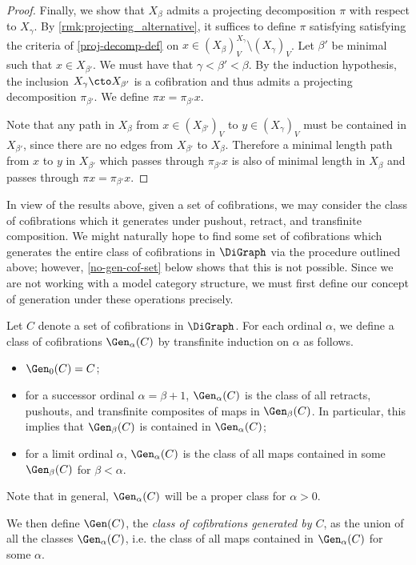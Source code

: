 \begin{proof}
Finally, we show that $X_\beta$ admits a projecting decomposition $\pi$ with respect to $X_\gamma$. By \cref{rmk:projecting_alternative}, it suffices to define $\pi$ satisfying satisfying the criteria of \cref{proj-decomp-def} on $x \in (X_\beta)^{X_{\gamma}}_V \setminus (X_{\gamma})_V$. Let $\beta'$ be minimal such that $x\in X_{\beta'}$. We must have that $\gamma < \beta' < \beta$. By the induction hypothesis, the inclusion $X_\gamma \cto X_{\beta'}$ is a cofibration and thus admits a projecting decomposition $\pi_{\beta'}$. We define $\pi x = \pi_{\beta'} x$.

Note that any path in $X_\beta$ from $x \in (X_{\beta'})_V$ to $y\in (X_\gamma)_V$ must be contained in $X_{\beta'}$, since there are no edges from $X_{\beta'}$ to $ X_{\beta}$. Therefore a minimal length path from $x$ to $y$ in $X_{\beta'}$ which passes through $\pi_{\beta'}x$ is also of minimal length in $X_\beta$ and passes through $\pi x=\pi_{\beta'}x$.
\end{proof}

In view of the results above, given a set of cofibrations, we may consider the class of cofibrations which it generates under pushout, retract, and transfinite composition. 
We might naturally hope to find some set of cofibrations which generates the entire class of cofibrations in $\DiGraph$ via the procedure outlined above; however, \cref{no-gen-cof-set} below shows that this is not possible.
Since we are not working with a model category structure, we must first define our concept of generation under these operations precisely.

\begin{defi}
Let $C$ denote a set of cofibrations in $\DiGraph$. For each ordinal $\alpha$, we define a class of cofibrations $\Gen_\alpha(C)$ by transfinite induction on $\alpha$ as follows.
\begin{itemize}
    \item $\Gen_0(C) = C$;
    \item for a successor ordinal $\alpha = \beta + 1$, $\Gen_\alpha(C)$ is the class of all retracts, pushouts, and transfinite composites of maps in $\Gen_\beta(C)$. In particular, this implies that $\Gen_\beta(C)$ is contained in $\Gen_\alpha(C)$;
    \item for a limit ordinal $\alpha$, $\Gen_\alpha(C)$ is the class of all maps contained in some $\Gen_\beta(C)$ for $\beta < \alpha$.
\end{itemize}
Note that in general, $\Gen_\alpha(C)$ will be a proper class for $\alpha > 0$.

We then define $\Gen(C)$, the \emph{class of cofibrations generated by $C$}, as the union of all the classes $\Gen_{\alpha}(C)$, i.e.  the class of all maps contained in $\Gen_\alpha(C)$ for some $\alpha$.
\end{defi}

